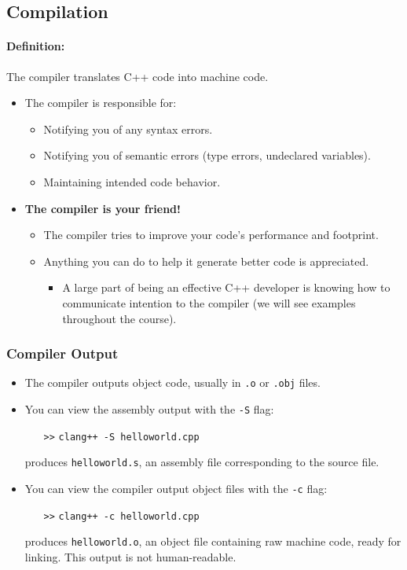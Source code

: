 \documentclass{article}
\begin{document}
\subsection{Compilation}

\paragraph{Definition:}
The compiler translates C++ code into machine code.

\begin{itemize}
	\item The compiler is responsible for:
	\begin{itemize}
		\item Notifying you of any syntax errors.
		\item Notifying you of semantic errors (type errors, undeclared variables).
		\item Maintaining intended code behavior.
	\end{itemize}
	\item \textbf{The compiler is your friend!}
	\begin{itemize}
		\item The compiler tries to improve your code's performance and footprint.
		\item Anything you can do to help it generate better code is appreciated.
		\begin{itemize}
			\item A large part of being an effective C++ developer is knowing how to communicate intention to the compiler (we will see examples throughout the course).
		\end{itemize}
	\end{itemize}
\end{itemize}

\subsubsection{Compiler Output}

\begin{itemize}
	\item The compiler outputs object code, usually in \texttt{.o} or \texttt{.obj} files.
	\item You can view the assembly output with the \texttt{-S} flag:
	\begin{itemize}
	\item[\texttt{>>}]\texttt{clang++ -S helloworld.cpp}
	\end{itemize}
	produces \texttt{helloworld.s}, an assembly file corresponding to the source file.
	\item You can view the compiler output object files with the \texttt{-c} flag:
	\begin{itemize}
		\item[\texttt{>>}] \texttt{clang++ -c helloworld.cpp}
	\end{itemize}
	produces \texttt{helloworld.o}, an object file containing raw machine code, ready for linking. This output is not human-readable.
\end{itemize}
\end{document}
